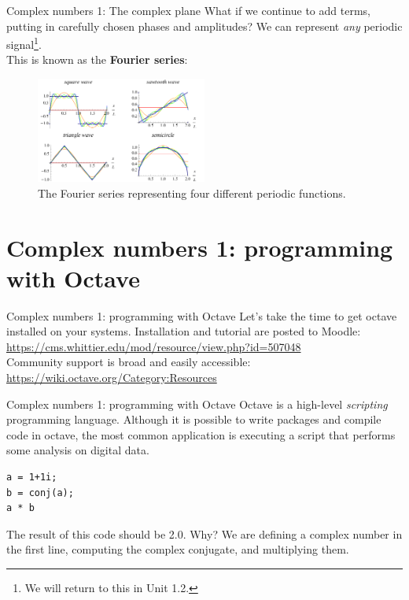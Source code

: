 \documentclass{beamer}
\begin{document}
\begin{frame}{Complex numbers 1: The complex plane}
\small
What if we continue to add terms, putting in carefully chosen phases and amplitudes?  We can represent \textit{any} periodic signal\footnote{We will return to this in Unit 1.2.}.  \\ \vspace{0.5cm}
This is known as the \textbf{\alert{Fourier series}}:
\begin{figure}
\centering
\includegraphics[width=0.5\textwidth]{figures/Fourier_Series.png}
\caption{\label{fig:fourier} The Fourier series representing four different periodic functions.}
\end{figure}
\end{frame}

\section{Complex numbers 1: programming with Octave}

\begin{frame}{Complex numbers 1: programming with Octave}
Let's take the time to get octave installed on your systems.  Installation and tutorial are posted to Moodle: \url{https://cms.whittier.edu/mod/resource/view.php?id=507048} \\ \vspace{0.5cm}
Community support is broad and easily accessible: \url{https://wiki.octave.org/Category:Resources}
\end{frame}

\begin{frame}[fragile]{Complex numbers 1: programming with Octave}
Octave is a high-level \textit{scripting} programming language.  Although it is possible to write packages and compile code in octave, the most common application is executing a script that performs some analysis on digital data. \\
\begin{verbatim}
a = 1+1i;
b = conj(a);
a * b
\end{verbatim}
The result of this code should be 2.0.  Why?  We are defining a complex number in the first line, computing the complex conjugate, and multiplying them.
\end{frame}
\end{document}
